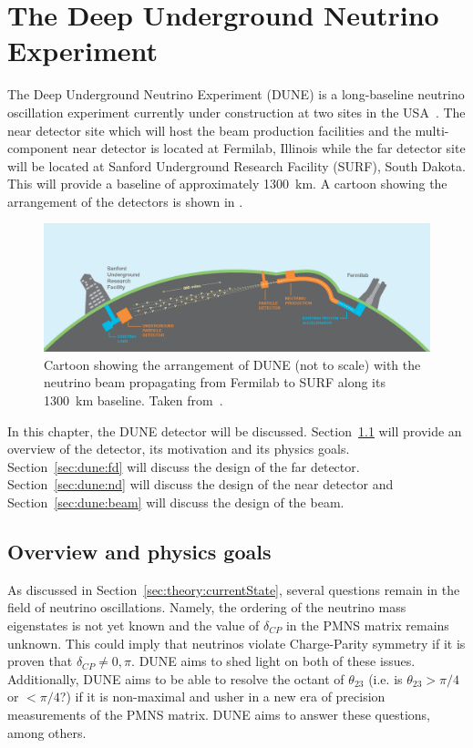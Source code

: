 \chapter{The Deep Underground Neutrino Experiment}
\label{sec:dune}

The Deep Underground Neutrino Experiment (DUNE) is a long-baseline neutrino oscillation experiment currently under construction at two sites in the USA~\cite{tdrVol1, tdrVol2, tdrVol3, tdrVol4}.
The near detector site which will host the beam production facilities and the multi-component near detector is located at Fermilab, Illinois while the far detector site will be located at Sanford Underground Research Facility (SURF), South Dakota.
This will provide a baseline of approximately 1300~km.
A cartoon showing the arrangement of the detectors is shown in .

\begin{figure}[h]
  \centering
  \includegraphics[width=.9\linewidth]{files/figures/dune_detector/duneCartoon}
  \caption[Cartoon of DUNE.]{Cartoon showing the arrangement of DUNE (not to scale) with the neutrino beam propagating from Fermilab to SURF along its 1300~km baseline. Taken from~\cite{tdrVol1}.}
  \label{fig:duneCartoon}
\end{figure}

In this chapter, the DUNE detector will be discussed.
Section~\ref{sec:dune:overview} will provide an overview of the detector, its motivation and its physics goals.
Section~\ref{sec:dune:fd} will discuss the design of the far detector.
Section~\ref{sec:dune:nd} will discuss the design of the near detector and Section~\ref{sec:dune:beam} will discuss the design of the beam.

\section{Overview and physics goals}
\label{sec:dune:overview}
As discussed in Section~\ref{sec:theory:currentState}, several questions remain in the field of neutrino oscillations.
Namely, the ordering of the neutrino mass eigenstates is not yet known and the value of $\delta_{CP}$ in the PMNS matrix remains unknown.
This could imply that neutrinos violate Charge-Parity symmetry if it is proven that $\delta_{CP} \neq 0, \pi$.
DUNE aims to shed light on both of these issues.
Additionally, DUNE aims to be able to resolve the octant of $\theta_{23}$ (i.e. is $\theta_{23} > \pi/4$ or $< \pi/4$?) if it is non-maximal and usher in a new era of precision measurements of the PMNS matrix. 
DUNE aims to answer these questions, among others.

